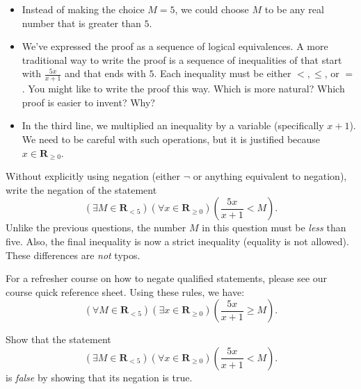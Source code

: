 \documentclass[12pt,fleqn,answers]{exam}
\newcommand{\reals}{\mathbf{R}}
\renewenvironment{solution}
  {\begin{shaded*}} %
  {\end{shaded*}}   %
\begin{document}
\begin{questions}
\begin{solution}
\begin{itemize}
\item Instead of making the choice $M = 5$, we could choose $M$ to 
be any real number that is greater than $5$.

\item We've expressed the proof as a sequence of logical equivalences.
 A more traditional way to write the proof is a sequence of inequalities of
that start with $\frac{5 x}{x+1}$ and that ends with $5$. Each
inequality must be either $<, \leq$, or $=$. You might like to write the
proof this way. Which is more natural? Which proof is easier to invent?
Why?

\item In the third line, we multiplied an inequality by a variable 
(specifically $x+1$). We need to be careful with such operations, but
it is justified because $x \in \reals_{\geq 0}$.
\end{itemize}
\end{solution}

\question [10]  Without explicitly using negation (either $\lnot$ or anything equivalent to negation), write the negation of the statement
\begin{equation*}
\left(\exists M \in  \reals_{< 5} \right)
\left(\forall x \in  \reals_{\geq 0} \right) \left(\frac{5 x}{x+1} <  M \right).
\end{equation*}
Unlike the previous questions, the number $M$ in this question must be \emph{less} than five. Also,
the final inequality is now a strict inequality (equality is not allowed). These differences are \emph{not} typos.

\begin{solution} For a refresher course on how to negate qualified
  statements, please see our course quick reference sheet. Using these
  rules, we have:
  \begin{equation*}
    \left(\forall M \in  \reals_{< 5} \right)
    \left(\exists x \in  \reals_{\geq 0} \right) 
    \left(\frac{5 x}{x+1} \geq   M \right).
    \end{equation*}  
\end{solution}

\question [10]  Show that the statement 
\begin{equation*}
\left(\exists M \in  \reals_{< 5} \right)
\left(\forall x \in  \reals_{\geq 0} \right) \left(\frac{5 x}{x+1}  < M \right).
\end{equation*}
is \emph{false} by showing that its negation is true.

\begin{solution}


\end{solution}
\end{questions}
\end{document}

